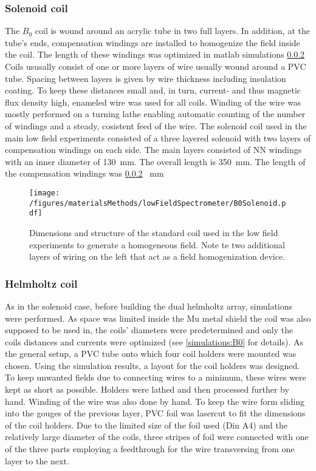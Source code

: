         \subsubsection{Solenoid coil}
            The $B_0$ coil is wound around an acrylic tube in two full layers. In addition, at the
            tube's ends, compensation windings are installed to homogenize the field inside the coil.
            The length of these windings was optimized in matlab simulations \ref{} 
            Coils ususally consist of one or more layers of wire usually wound around a PVC tube. Spacing between layers is given by wire thickness including insulation coating. To keep  these distances small and, in turn, current- and thus magnetic flux density high, enameled wire was used for all coils. Winding of the wire was mostly performed on a turning lathe enabling automatic counting of the number of windings and a steady, cosistent feed of the wire.
            The solenoid coil used in the main low field experiments consisted of a three layered solenoid with two layers of compensation windings on each side. The main layers consisted of NN windings with an inner diameter of \SI{130}{\mm}. The overall length is \SI{350}{\milli\meter}. The length of the compensation windings was \ref{} \SI{}{\mm}
            \begin{figure}
                \centering
                \texttt{[image: /figures/materialsMethods/lowFieldSpectrometer/B0Solenoid.pdf]}
                \caption[B0 coil layout]{Dimensions and structure of the standard coil used in the low field experiments to generate a homogeneous field. Note te two additional layers of wiring on the left that act as a field homogenization device.}
            \end{figure}
        \subsubsection{Helmholtz coil}
            As in the solenoid case, before building the dual helmholtz array, simulations were performed.  As space was limited inside the Mu metal shield the coil was also supposed to be used in, the coils' diameters were predetermined and only the coils distances and currents were optimized (see \ref{simulations:B0} for details). As the general setup, a PVC tube onto which four coil holders were mounted was chosen. Using the simulation results, a layout for the coil holders was designed. To keep unwanted fields due to connecting wires to a minimum, these wires were kept as short as possible. Holders were lathed and then processed further by hand. Winding of the wire was also done by hand. To keep the wire form sliding into the gouges of the previous layer, PVC foil was lasercut to fit the dimensions of the coil holders. Due to the limited size of the foil used (Din A4) and the relatively large diameter of the coils, three stripes of foil were connected with one of the three parts employing a feedthrough for the wire transversing from one layer to the next. 
